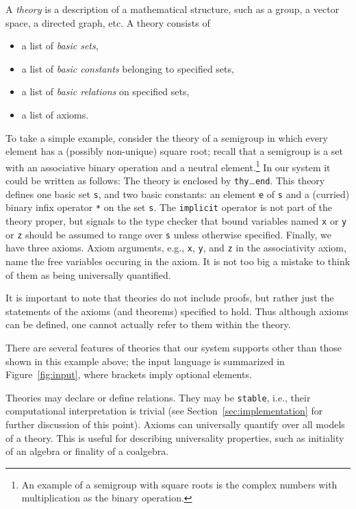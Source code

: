 A \emph{theory} is a description of a mathematical structure, such as
a group, a vector space, a directed graph, etc. A theory consists of
%
\begin{itemize}
\item a list of \emph{basic sets},
\item a list of \emph{basic constants} belonging to specified sets,
\item a list of \emph{basic relations} on specified sets,
\item a list of axioms.
\end{itemize}
%
To take a simple example, consider the theory of a semigroup in which
every element has a (possibly non-unique) square root; recall that a
semigroup is a set with an associative binary operation and a neutral
element.\footnote{An example of a semigroup with square roots is the
  complex numbers with multiplication as the binary operation.} In our
system it could be written as follows:
\vspace{-0.2truecm}
{
\small
{}
}
\goodbreak\goodbreak
\noindent The theory is enclosed by \Verb|thy|\ldots\Verb|end|. This theory
defines one basic set \Verb|s|, and two basic constants: an element
\Verb|e| of \Verb|s| and a (curried) binary infix operator \Verb|*| on
the set \Verb|s|. The \Verb|implicit| operator is not part of the
theory proper, but signals to the type checker that bound
variables named \Verb|x| or \Verb|y| or \Verb|z| should be assumed to
range over \Verb|s| unless otherwise specified. Finally,
we have three axioms. Axiom arguments, e.g., \Verb|x|, \Verb|y|, and
\Verb|z| in the associativity axiom, name the free variables occuring
in the axiom. It is not too big a mistake to think of them as being
universally quantified.

It is important to note that theories do not include proofs, but
rather just the statements of the axioms (and theorems) specified to
hold. Thus although axioms can be defined, one cannot actually refer
to them within the theory.

There are several features of theories that our system supports other
than those shown in this example above; the input language is
summarized in Figure~\ref{fig:input}, where brackets imply optional
elements.


Theories may declare or define relations. They may be \Verb|stable|,
i.e., their computational interpretation is trivial (see
Section~\ref{sec:implementation} for further discussion of this
point). Axioms can universally quantify over all models of a theory.
This is useful for describing universality properties, such as
initiality of an algebra or finality of a coalgebra.
  
